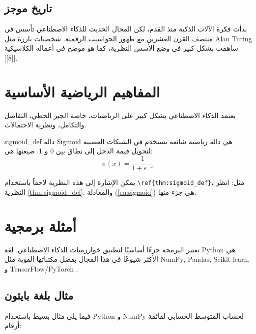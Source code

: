 \documentclass[12pt, a4paper]{article}
\begin{document}
\subsection{تاريخ موجز}
بدأت فكرة الآلات الذكية منذ القدم، لكن المجال الحديث للذكاء الاصطناعي تأسس في منتصف القرن العشرين مع ظهور الحواسيب الرقمية. شخصيات بارزة مثل \textenglish{Alan Turing} ساهمت بشكل كبير في وضع الأسس النظرية، كما هو موضح في أعماله الكلاسيكية [[8]].

\section{المفاهيم الرياضية الأساسية}

يعتمد الذكاء الاصطناعي بشكل كبير على الرياضيات، خاصة الجبر الخطي، التفاضل والتكامل، ونظرية الاحتمالات.

\begin{theorembox}{sigmoid_def}
دالة \textenglish{Sigmoid} هي دالة رياضية شائعة تستخدم في الشبكات العصبية لتحويل قيمة الدخل إلى نطاق بين 0 و 1. صيغتها هي:
\begin{equation} \label{eq:sigmoid}
\sigma(x) = \frac{1}{1 + e^{-x}}
\end{equation}
\end{theorembox}

يمكن الإشارة إلى هذه النظرية لاحقاً باستخدام \verb|\ref{thm:sigmoid_def}|، مثل: انظر النظرية \ref{thm:sigmoid_def}.
والمعادلة (\ref{eq:sigmoid}) هي جزء منها.

\section{أمثلة برمجية}

تعتبر البرمجة جزءًا أساسيًا لتطبيق خوارزميات الذكاء الاصطناعي. لغة \textenglish{Python} هي الأكثر شيوعًا في هذا المجال بفضل مكتباتها القوية مثل \textenglish{NumPy}, \textenglish{Pandas}, \textenglish{Scikit-learn}, و \textenglish{TensorFlow/PyTorch} \cite{numpy_harris2020, tensorflow2015-whitepaper}.

\subsection{مثال بلغة بايثون}
فيما يلي مثال بسيط باستخدام \textenglish{Python} و \textenglish{NumPy} \cite{numpy_harris2020} لحساب المتوسط الحسابي لقائمة أرقام:
\end{document}
